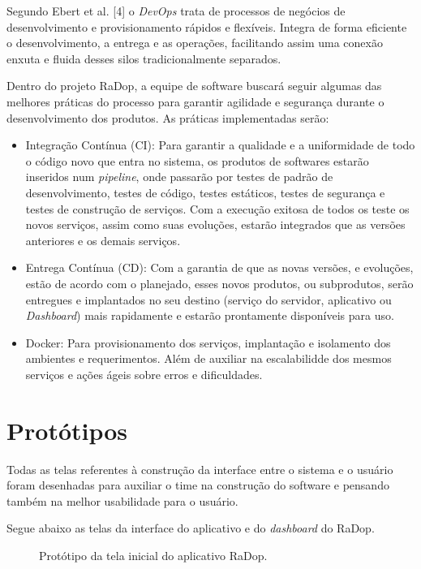 Segundo Ebert et al. [4] o \textit{DevOps} trata de processos de negócios de desenvolvimento e provisionamento rápidos e flexíveis. Integra de forma eficiente o desenvolvimento, a entrega e as operações, facilitando assim uma conexão enxuta e fluida desses silos tradicionalmente separados.

Dentro do projeto RaDop, a equipe de software buscará seguir algumas das melhores práticas do processo para garantir agilidade e segurança durante o desenvolvimento dos produtos. As práticas implementadas serão:
\begin{itemize}
    \item Integração Contínua (CI): Para garantir a qualidade e a uniformidade de todo o código novo que entra no sistema, os produtos de softwares estarão inseridos num \textit{pipeline}, onde passarão por testes de padrão de desenvolvimento, testes de código, testes estáticos, testes de segurança e testes de construção de serviços. Com a execução exitosa de todos os teste os novos serviços, assim como suas evoluções, estarão integrados que as versões anteriores e os demais serviços. 
    \item Entrega Contínua (CD): Com a garantia de que as novas versões, e evoluções, estão de acordo com o planejado, esses novos produtos, ou subprodutos, serão entregues e implantados no seu destino (serviço do servidor, aplicativo ou \textit{Dashboard}) mais rapidamente e estarão prontamente disponíveis para uso.
    \item Docker: Para provisionamento dos serviços, implantação e isolamento dos ambientes e requerimentos. Além de auxiliar na escalabilidde dos mesmos serviços e ações ágeis sobre erros e dificuldades.
\end{itemize}

\section{Protótipos}

Todas as telas referentes à construção da interface entre o sistema e o usuário foram desenhadas para auxiliar o time na construção do software e pensando também na melhor usabilidade para o usuário.

Segue abaixo as telas da interface do aplicativo e do \textit{dashboard} do RaDop.

\begin{figure}[ht]
	\caption{\label{fig:tela_inicial} Protótipo da tela inicial do aplicativo RaDop.}
\end{figure}\newpage

